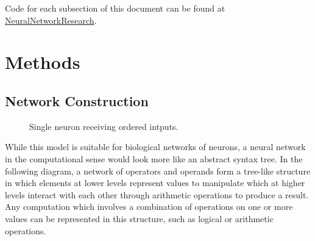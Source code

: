 \documentclass{article}
\begin{document}
     Code for each subsection of this document can be found at \href{https://github.com/DariusBxsci/NeuralNetworkResearch/tree/master/NeuralNets}{NeuralNetworkResearch}. 


\section{Methods}

\subsection{Network Construction}
 
 \begin{figure}[!htb]
 \centering
 \caption{Single neuron receiving ordered intputs. \label{fig:sig-neuron}}
\end{figure}

While this model is suitable for biological networks of neurons, a neural network in the computational sense would look more like an abstract syntax tree. In the following diagram, a network of operators and operands form a tree-like structure in which elements at lower levels represent values to manipulate which at higher levels interact with each other through arithmetic operations to produce a result. Any computation which involves a combination of operations on one or more values can be represented in this structure, such as logical or arithmetic operations.
\end{document}
